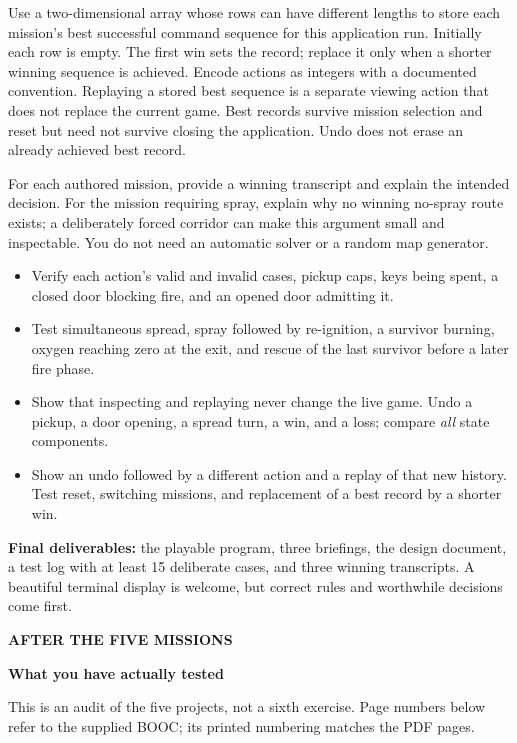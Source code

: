 \documentclass[11pt,a4paper]{article}
\newcommand{\labeltext}[1]{{\small\sffamily\bfseries\color{teal}#1}}
\newcommand{\sub}[1]{\par\vspace{5pt}{\large\sffamily\bfseries\color{ink}#1}\par\vspace{1pt}}
\begin{document}
Use a two-dimensional array whose rows can have different lengths to store each mission's best successful command sequence for this application run. Initially each row is empty. The first win sets the record; replace it only when a shorter winning sequence is achieved. Encode actions as integers with a documented convention. Replaying a stored best sequence is a separate viewing action that does not replace the current game. Best records survive mission selection and reset but need not survive closing the application. Undo does not erase an already achieved best record.

For each authored mission, provide a winning transcript and explain the intended decision. For the mission requiring spray, explain why no winning no-spray route exists; a deliberately forced corridor can make this argument small and inspectable. You do not need an automatic solver or a random map generator.

\sub{Release evidence}
\begin{itemize}
\item Verify each action's valid and invalid cases, pickup caps, keys being spent, a closed door blocking fire, and an opened door admitting it.
\item Test simultaneous spread, spray followed by re-ignition, a survivor burning, oxygen reaching zero at the exit, and rescue of the last survivor before a later fire phase.
\item Show that inspecting and replaying never change the live game. Undo a pickup, a door opening, a spread turn, a win, and a loss; compare \emph{all} state components.
\item Show an undo followed by a different action and a replay of that new history. Test reset, switching missions, and replacement of a best record by a shorter win.
\end{itemize}
\textbf{Final deliverables:} the playable program, three briefings, the design document, a test log with at least 15 deliberate cases, and three winning transcripts. A beautiful terminal display is welcome, but correct rules and worthwhile decisions come first.

\clearpage{}
\labeltext{AFTER THE FIVE MISSIONS}
\par{\LARGE\sffamily\bfseries\color{ink}What you have actually tested}\par
This is an audit of the five projects, not a sixth exercise. Page numbers below refer to the supplied BOOC; its printed numbering matches the PDF pages.
\end{document}
